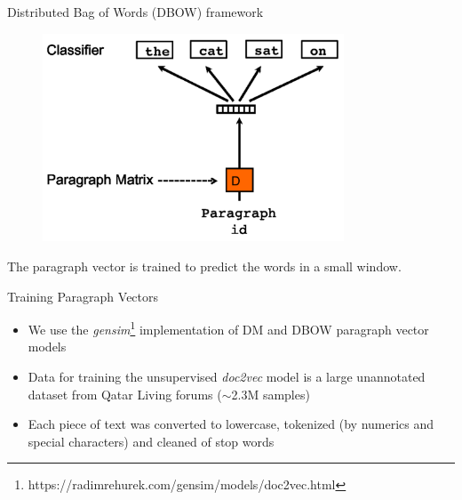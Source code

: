\documentclass[10pt]{beamer}
\begin{document}
\begin{frame}{Distributed Bag of Words (DBOW) framework}
	\begin{figure}[t!]
	  \centering
	  \includegraphics[keepaspectratio, width=0.8\textwidth]{./Pictures/pv-dbow.png}
	  \label{fig:pv-dbow}
	\end{figure}
	The paragraph vector is trained to predict the words in a small window.
\end{frame}

\begin{frame}{Training Paragraph Vectors}
	
\begin{itemize}
\item We use the \textit{gensim}\footnote{https://radimrehurek.com/gensim/models/doc2vec.html} implementation of DM and DBOW paragraph vector models
\item Data for training the unsupervised \textit{doc2vec} model is a large unannotated dataset from Qatar Living forums ($\sim$2.3M samples)
\item Each piece of text was converted to lowercase, tokenized (by numerics and special characters) and cleaned of stop words
\end{itemize}

\end{frame}
\end{document}
